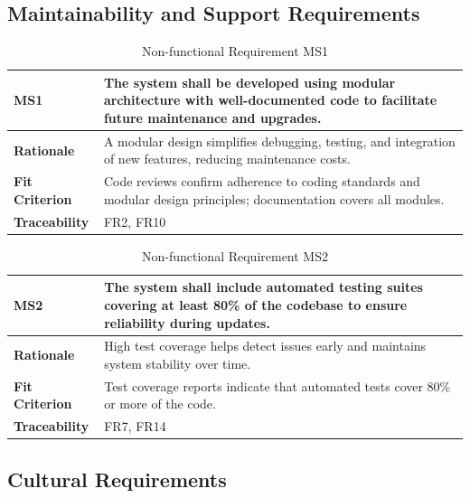 \documentclass[12pt]{article}
\begin{document}
\subsection{Maintainability and Support Requirements}

\begin{table}[h!]
\centering
{}
\begin{tabular}{|p{3.5cm}|p{11.5cm}|}
\hline
\rowcolor{gray!30}
\textbf{MS1} & The system shall be developed using modular architecture with well-documented code to facilitate future maintenance and upgrades. \\
\hline
\textbf{Rationale} & A modular design simplifies debugging, testing, and integration of new features, reducing maintenance costs. \\
\hline
\textbf{Fit Criterion} & Code reviews confirm adherence to coding standards and modular design principles; documentation covers all modules. \\
\hline
\textbf{Traceability} & FR2, FR10 \\
\hline
\end{tabular}
\caption{Non-functional Requirement MS1}
\end{table}

\begin{table}[h!]
\centering
{}
\begin{tabular}{|p{3.5cm}|p{11.5cm}|}
\hline
\rowcolor{gray!30}
\textbf{MS2} & The system shall include automated testing suites covering at least 80\% of the codebase to ensure reliability during updates. \\
\hline
\textbf{Rationale} & High test coverage helps detect issues early and maintains system stability over time. \\
\hline
\textbf{Fit Criterion} & Test coverage reports indicate that automated tests cover 80\% or more of the code. \\
\hline
\textbf{Traceability} & FR7, FR14 \\
\hline
\end{tabular}
\caption{Non-functional Requirement MS2}
\end{table}

\subsection{Cultural Requirements}
\end{document}
